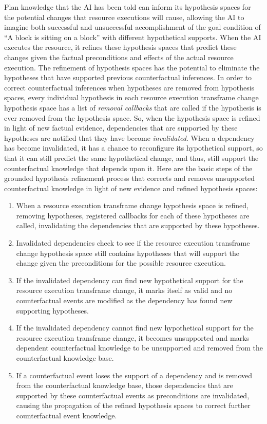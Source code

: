 Plan knowledge that the AI has been told can inform its hypothesis
spaces for the potential changes that resource executions will cause,
allowing the AI to imagine both successful and unsuccessful
accomplishment of the goal condition of ``A block is sitting on a
block'' with different hypothetical supports.  When the AI executes
the resource, it refines these hypothesis spaces that predict these
changes given the factual preconditions and effects of the actual
resource execution.  The refinement of hypothesis spaces has the
potential to eliminate the hypotheses that have supported previous
counterfactual inferences.  In order to correct counterfactual
inferences when hypotheses are removed from hypothesis spaces, every
individual hypothesis in each resource execution transframe change
hypothesis space has a list of \emph{removal callbacks} that are
called if the hypothesis is ever removed from the hypothesis space.
So, when the hypothesis space is refined in light of new factual
evidence, dependencies that are supported by these hypotheses are
notified that they have become \emph{invalidated}.  When a dependency
has become invalidated, it has a chance to reconfigure its
hypothetical support, so that it can still predict the same
hypothetical change, and thus, still support the counterfactual
knowledge that depends upon it.  Here are the basic steps of the
grounded hypothesis refinement process that corrects and removes
unsupported counterfactual knowledge in light of new evidence and
refined hypothesis spaces:
\begin{enumerate}
\item When a resource execution transframe change hypothesis space is
  refined, removing hypotheses, registered callbacks for each of these
  hypotheses are called, invalidating the dependencies that are
  supported by these hypotheses.
\item Invalidated dependencies check to see if the resource execution
  transframe change hypothesis space still contains hypotheses that
  will support the change given the preconditions for the possible
  resource execution.
\item If the invalidated dependency can find new hypothetical support
  for the resource execution transframe change, it marks itself as
  valid and no counterfactual events are modified as the dependency
  has found new supporting hypotheses.
\item If the invalidated dependency cannot find new hypothetical
  support for the resource execution transframe change, it becomes
  unsupported and marks dependent counterfactual knowledge to be
  unsupported and removed from the counterfactual knowledge base.
\item If a counterfactual event loses the support of a dependency and
  is removed from the counterfactual knowledge base, those
  dependencies that are supported by these counterfactual events as
  preconditions are invalidated, causing the propagation of the
  refined hypothesis spaces to correct further counterfactual event knowledge.
\end{enumerate}

